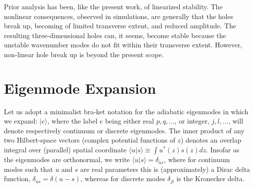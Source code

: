 \documentclass{jpp}
\def\ket#1{|#1\rangle}
\def\bra#1{\langle#1}
\begin{document}
Prior analysis has been, like the present work, of linearized
stability. The nonlinear consequences, observed in simulations, are
generally that the holes break up, becoming of limited transverse
extent, and reduced amplitude. The resulting three-dimensional holes
can, it seems, become stable because the unstable wavenumber modes do
not fit within their transverse extent. However, non-linear hole break up
is beyond the present scope.

\section{Eigenmode Expansion}
Let us adopt a minimalist bra-ket notation for the adiabatic
eigenmodes in which we expand: $\ket{e}$, where the label $e$ being
either real $p,q,\dots$, or integer, $j,l,\dots$, will denote
respectively continuum or discrete eigenmodes. The inner product of
any two Hilbert-space vectors (complex potential functions of $z$)
denotes an overlap integral over (parallel) spatial coordinate
$\bra{u}\ket{s}\equiv \int u^*(z)s(z)dz$. Insofar as the eigenmodes
are orthonormal, we write $\bra{u}\ket{s}=\delta_{us}$, where for
continuum modes such that $u$ and $s$ are real parameters this is
(approximately) a Dirac delta function, $\delta_{us}=\delta(u-s)$,
whereas for discrete modes $\delta_{jl}$ is the Kronecker delta.
\end{document}
